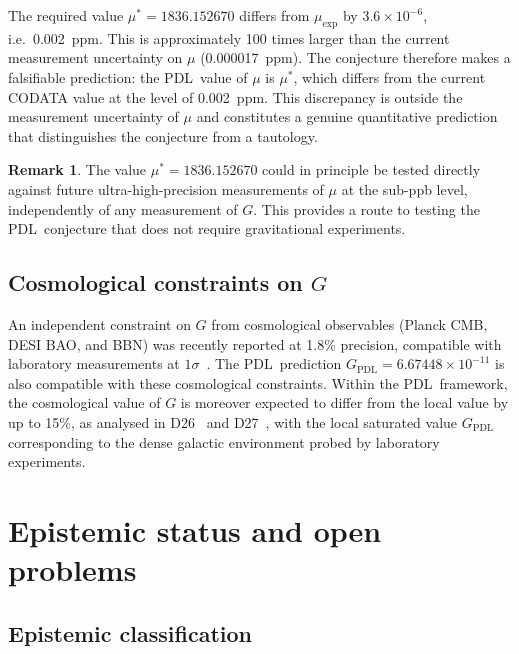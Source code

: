 \documentclass[11pt,a4paper]{article}
\theoremstyle{definition}
\newtheorem{remark}[theorem]{Remark}
\newcommand{\PDL}{\textnormal{PDL}}
\newcommand{\GPDL}{G_{\mathrm{PDL}}}
\newcommand{\muexp}{\mu_{\mathrm{exp}}}
\newcommand{\mustar}{\mu^*}
\begin{document}
The required value $\mustar = 1836.152670$ differs from $\muexp$ by $3.6\times10^{-6}$, i.e.\ 0.002~ppm. This is approximately 100 times larger than the current measurement uncertainty on $\mu$ (0.000017~ppm). The conjecture therefore makes a falsifiable prediction: the \PDL\ value of $\mu$ is $\mustar$, which differs from the current CODATA value at the level of 0.002~ppm. This discrepancy is outside the measurement uncertainty of $\mu$ and constitutes a genuine quantitative prediction that distinguishes the conjecture from a tautology.

\begin{remark}
\label{rem:mu_test}
The value $\mustar = 1836.152670$ could in principle be tested directly against future ultra-high-precision measurements of $\mu$ at the sub-ppb level, independently of any measurement of $G$. This provides a route to testing the \PDL\ conjecture that does not require gravitational experiments.
\end{remark}

\subsection{Cosmological constraints on \texorpdfstring{$G$}{G}}
\label{subsec:cosmo_G}

An independent constraint on $G$ from cosmological observables (Planck CMB, DESI BAO, and BBN) was recently reported at 1.8\% precision, compatible with laboratory measurements at $1\sigma$~\cite{Bourakadi_2025}. The \PDL\ prediction $\GPDL = 6.67448\times10^{-11}$ is also compatible with these cosmological constraints. Within the \PDL\ framework, the cosmological value of $G$ is moreover expected to differ from the local value by up to 15\%, as analysed in D26~\cite{Hubble_Resolution_PDL_2026} and D27~\cite{NCMB_PDL_2026}, with the local saturated value $\GPDL$ corresponding to the dense galactic environment probed by laboratory experiments.

\section{Epistemic status and open problems}
\label{sec:open}

\subsection{Epistemic classification}
\label{subsec:epistemic}
\end{document}
